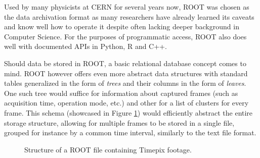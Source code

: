 Used by many physicists at CERN for several years now, ROOT was chosen as the data archivation format as many researchers have already learned its caveats and know well how to operate it despite often lacking deeper background in Computer Science. For the purposes of programmatic access, ROOT also does well with documented APIs in Python, R and C++.

Should data be stored in ROOT, a basic relational database concept comes to mind. ROOT however offers even more abstract data structures with standard tables generalized in the form of \textit{trees} and their columns in the form of \textit{leaves}. One such tree would suffice for information about captured frames (such as acquisition time, operation mode, etc.) and other for a list of clusters for every frame. This schema (showcased in Figure \ref{fig:root-trees}) would efficiently abstract the entire storage structure, allowing for multiple frames to be stored in a single file, grouped for instance by a common time interval, similarly to the text file format.

\begin{figure}[t]
\begin{center}


\caption{Structure of a ROOT file containing Timepix footage.}
\label{fig:root-trees}
\end{center}
\end{figure}


